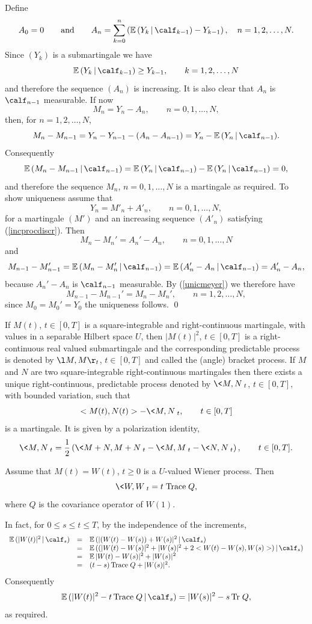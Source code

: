 \documentclass[preprint]{imsart}
\def\E{\mathbb E}
\begin{document}
{
Define
$$
A_0=0\qquad {\rm and}\qquad A_n=\sum_{k=0}^{n}\left(
\E\, (Y_k\,|\, \calf_{k-1})-Y_{k-1}\right),
\quad n=1,2,\ldots, N.
$$
Since $(Y_k)$ is a submartingale we have
$$
\E\, (Y_k\,|\, \calf_{k-1})\geq Y_{k-1},
\qquad k=1,2,\ldots, N
$$
and therefore the sequence $(A_n)$ is increasing. It is also clear
that $A_n$ is $\calf_{n-1}$ measurable. If now
$$
M_n=Y_n-A_n,\qquad n=0,1,\ldots, N,
$$
then, for $n=1,2,\ldots, N$,
$$
M_n-M_{n-1}=Y_n-Y_{n-1} -(A_n-A_{n-1})=
Y_n-\E\, (Y_n\,|\,\calf_{n-1}).
$$
Consequently
$$
\E\, (M_n-M_{n-1}\,|\,\calf_{n-1})
=\E\, (Y_n\,|\,\calf_{n-1})-\E\, (Y_n\,|\,\calf_{n-1})=0,
$$
and therefore the sequence $M_n$, $n=0,1,\ldots, N$ is a
martingale as required. To show uniqueness assume that
$$
Y_n=M'_n+A'_n,\qquad
n=0,1,\ldots, N,
$$
for a martingale $(M')$ and an increasing sequence
$(A'_n)$ satisfying (\ref{incprocdiscr}). Then
\begin{equation}\label{unicmeyer}
  M_n-M_n'=A_n'-A_n,\qquad
n=0,1,\ldots, N
\end{equation}
and
$$
  M_{n-1}-M_{n-1}'= \E\, (  M_{n}-M_{n}'\,|\,\calf_{n-1})
=\E\, (  A_{n}'-A_n\,|\,\calf_{n-1})=A_{n}'-A_n,
$$
because $A_{n}'-A_n$ is $\calf_{n-1}$ measurable.
By (\ref{unicmeyer}) we therefore have
$$
 M_{n-1}-M_{n-1}'= M_{n}-M_{n}',
 \qquad n=1,2,\ldots, N,
 $$
 since $M_0=M_0'=Y_0$ the uniqueness follows.
\qed


If $M(t)$, $t\in [0,T]$ is a square-integrable
and right-continuous martingale, with values in a separable
Hilbert space $U$, then  $|M(t)|^2$, $t\in [0,T]$
is a right-continuous real valued submartingale
and the corresponding predictable process is denoted by
$\l M,M \r _t$, $t\in [0,T]$ and called the (angle) bracket process.
If $M$ and $N$ are two square-integrable right-continuous
martingales then there exists a unique right-continuous, predictable
process denoted by $\<M,N\>_t$, $t\in [0,T],$ with bounded
variation, such that
$$
<M(t),N(t)>-\<M,N\>_t, \qquad t\in [0,T]
$$
is a martingale. It is given by a polarization identity,
$$
\<M,N\>_t=\frac{1}{2}\left( \<M+N,M+N\>_t
-\<M,M\>_t -\<N,N\>_t\right), \qquad t\in [0,T].
$$


\begin{Example}\begin{em}
  Assume that $M(t)=W(t)$, $t\geq 0$ is a $U$-valued Wiener
  process. Then
  $$
  \<W,W\>_t=t\; {\rm Trace \;} Q,
  $$
where $Q$ is the covariance operator of $W(1)$.

In fact, for $0\leq s\leq t\leq T$, by the independence of the
increments,
$$
\begin{array}{lll}
  \E\, (|W(t)|^2\, |\, \calf_s) & = &
    \E\, (|(W(t)-W(s))+W(s)|^2\, |\, \calf_s) \\
    & = &     \E\, ((|W(t)-W(s)|^2+|W(s)|^2
    +2 <W(t)-W(s),W(s) >)\, |\, \calf_s) \\
    & = &  \E\, |W(t)-W(s)|^2+|W(s)|^2 \\
    & = & (t-s)\, {\rm Trace \;}Q+|W(s)|^2.
\end{array}
$$
Consequently
$$
 \E\, (|W(t)|^2-t\, {\rm Trace \;} Q\, |\, \calf_s)
 =|W(s)|^2-s\, {\rm Tr\;} Q,
 $$
 as required.
\end{em}
\end{Example}

}
\end{document}
